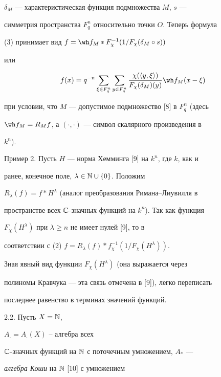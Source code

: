 $\delta_M$ --- характеристическая функция подмножества $M$, $s$ --- 


симметрия пространства $F^n_q$ относительно точки $O$. Теперь формула 


(3) принимает вид $f=\wh f_M*F^{-1}_\chi(1/F_\chi(\delta_M\circ s))$ 


или 


$$ 


f(x)=q^{-n}\sum_{\xi\in F^n_q}\sum_{y\in F^n_q} 


\frac{\chi(\langle y,\xi\rangle)}{F_\chi(\delta_M)(y)} 


\wh f_M(x-\xi) 


$$ 


при условии, что $M$ --- допустимое подмножество [8] в $F^n_q$ (здесь 


$\wh f_M=R_M f$, а $(\cdot ,\cdot )$ --- символ скалярного произведения в 


$k^n$). 


 


Пример 2. Пусть $H$ --- норма Хемминга [9] на $k^n$, где $k$, как и 


ранее, конечное поле, $\lambda\in\Bbb N\cup\{0\}$. Положим 


$R_\lambda(f)=f*H^\lambda$ (аналог преобразования Римана--Лиувилля в 


пространстве всех $\Bbb C$-значных функций на $k^n$). Так как функция 


$F_\chi(H^\lambda)$ при $\lambda\ge n$ не имеет нулей [9], то в 


соответствии с (2)\; $f=R_\lambda(f)*f^{-1}_\chi(1/F_\chi(H^\lambda))$. 


Зная явный вид функции $F_\chi(H^\lambda)$ (она выражается через 


полиномы Кравчука --- эта связь отмечена в [9]), легко переписать 


последнее равенство в терминах значений функций. 


\medskip 


 


2.2. Пусть $X=\Bbb N$,


$A_{\displaystyle\cdot}=A_{\displaystyle\cdot}(X)$ -- алгебра всех 


$\Bbb C$-значных функций на $\Bbb N$ с поточечным умножением, $A_*$ --- 


{\it алгебра Коши} на $\Bbb N$ [10] с умножением 


$$ 


